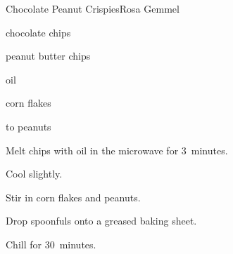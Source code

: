 \begin{recipe}{Chocolate Peanut Crispies}{Rosa Gemmel}{}

\begin{ingredients}
\item {} chocolate chips
\item {} peanut butter chips
\item {} oil
\item \C{3\half} corn flakes
\item \half{} to  peanuts
\end{ingredients}

\begin{directions}
\item Melt chips with oil in the microwave for 3~minutes.
\item Cool slightly.
\item Stir in corn flakes and peanuts.
\item Drop spoonfuls onto a greased baking sheet.
\item Chill for 30~minutes.
\end{directions}

\end{recipe}

